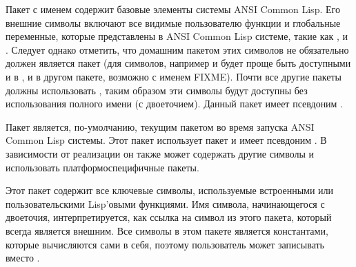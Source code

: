 \begin{flushdesc}
\item[\cdf{common-lisp}]
Пакет с именем  содержит базовые элементы системы ANSI Common
Lisp. Его внешние символы включают все видимые пользователю функции и глобальные
переменные, которые представлены в ANSI Common Lisp системе, такие как
,  и .
Следует однако отметить, что домашним пакетом этих символов не обязательно
должен является пакет  (для символов, например  и
 будет проще быть доступными и в , и в другом
пакете, возможно с именем  FIXME).
Почти все другие пакеты должны использовать , таким образом эти
символы будут доступны без использования полного имени (с двоеточием).
Данный пакет имеет псевдоним .

\item[\cdf{common-lisp-user}]
Пакет  является, по-умолчанию, текущим пакетом во время
запуска ANSI Common Lisp системы.
Этот пакет использует пакет  и имеет псевдоним .
В зависимости от реализации он также может содержать другие символы и
использовать платформоспецифичные пакеты.

\item[\cdf{keyword}]
Этот пакет содержит все ключевые символы, используемые встроенными или
пользовательскими Lisp'овыми функциями. Имя символа, начинающегося с двоеточия,
интерпретируется, как ссылка на символ из этого пакета, который всегда является
внешним. Все символы в этом пакете является константами, которые вычисляются
сами в себя, поэтому пользователь может записывать  вместо .
\end{flushdesc}

